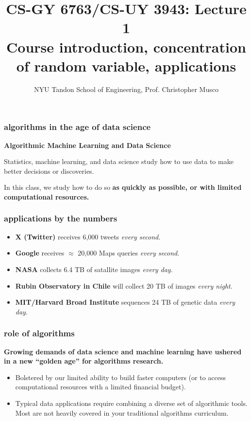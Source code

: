 \documentclass[]{beamer}
\title{CS-GY 6763/CS-UY 3943: Lecture 1 \\ Course introduction, concentration of random variable, applications}
\author{NYU Tandon School of Engineering, Prof. Christopher Musco}
\date{}
\begin{document}
	
	\begin{frame}
		\titlepage 
	\end{frame}
	
	\metroset{titleformat=smallcaps}
	
	\begin{frame}
		\frametitle{algorithms in the age of data science}	
		\begin{center}
			\large\textbf{Algorithmic Machine Learning and Data Science}
			
			Statistics, machine learning, and data science study how to use data to make better decisions or discoveries.
			
			\vspace{1em}
			In this class, we study how to do so \alert{\textbf{as quickly as possible, or with limited computational resources.}}
			
			
		\end{center}
	\end{frame}
	
	\begin{frame}
		\frametitle{applications by the numbers}
		\begin{itemize}
			\item \textbf{X (Twitter)} receives 6,000 tweets \emph{every second}.
			\item \textbf{Google} receives $\approx$ 20,000 Maps queries \emph{every second}.
			\item \textbf{NASA} collects 6.4 TB of satallite images \emph{every day}. 
			\item \textbf{Rubin Observatory in Chile} will collect 20 TB of images \emph{every night}. 
			\item \textbf{MIT/Harvard Broad Institute} sequences 24 TB of genetic data \emph{every day}. 
		\end{itemize}
	\end{frame}
	
	\begin{frame}
		\frametitle{role of algorithms}
		\textbf{Growing demands of data science and machine learning have ushered in a new ``golden age'' for algorithms research.}
		\begin{itemize}
			\item Bolstered by our limited ability to build faster computers (or to access computational resources with a limited financial  budget). 
			\item Typical data applications require combining a diverse set of algorithmic tools. Most are not heavily covered in your traditional algorithms curriculum.
		\end{itemize} 
	\end{frame}
	
\end{document}
